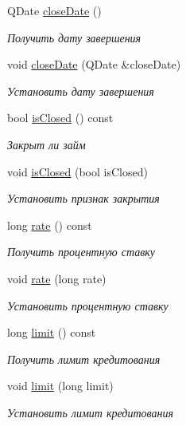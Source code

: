 \begin{DoxyCompactItemize}
Q\+Date \hyperlink{classkpk_1_1data_1_1_loan_af8ccbb954480eae0aa3b2a6b2f39fcb5}{close\+Date} ()
\begin{DoxyCompactList}\small\item\em Получить дату завершения \end{DoxyCompactList}\item 
void \hyperlink{classkpk_1_1data_1_1_loan_ada266f079bcda1b9877ab161655c22e1}{close\+Date} (Q\+Date \&close\+Date)
\begin{DoxyCompactList}\small\item\em Установить дату завершения \end{DoxyCompactList}\item 
bool \hyperlink{classkpk_1_1data_1_1_loan_a70783859ac8c369fbacf45743b7dc527}{is\+Closed} () const 
\begin{DoxyCompactList}\small\item\em Закрыт ли займ \end{DoxyCompactList}\item 
void \hyperlink{classkpk_1_1data_1_1_loan_a582b7aa81d2087f14f69caf92254e865}{is\+Closed} (bool is\+Closed)
\begin{DoxyCompactList}\small\item\em Установить признак закрытия \end{DoxyCompactList}\item 
long \hyperlink{classkpk_1_1data_1_1_loan_affb2d1a39a5c7c185b07d5f6de87a43e}{rate} () const 
\begin{DoxyCompactList}\small\item\em Получить процентную ставку \end{DoxyCompactList}\item 
void \hyperlink{classkpk_1_1data_1_1_loan_aefef4f72d088471f5f32d1843c221108}{rate} (long rate)
\begin{DoxyCompactList}\small\item\em Установить процентную ставку \end{DoxyCompactList}\item 
long \hyperlink{classkpk_1_1data_1_1_loan_ae82f80aa7a9b58fdfb2ac818dd33611d}{limit} () const 
\begin{DoxyCompactList}\small\item\em Получить лимит кредитования \end{DoxyCompactList}\item 
void \hyperlink{classkpk_1_1data_1_1_loan_a83d5b22665f19627d26f3a57903511e6}{limit} (long limit)
\begin{DoxyCompactList}\small\item\em Установить лимит кредитования \end{DoxyCompactList}\item 

\end{DoxyCompactItemize}
